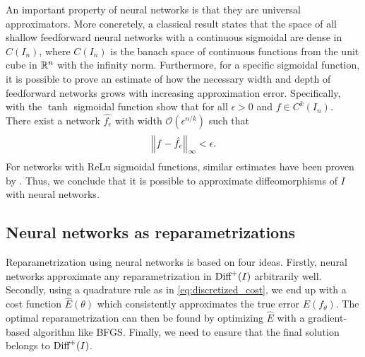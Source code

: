 An important property of neural networks is that they are universal approximators. More concretely, a classical result \cite[Theorem 2]{cybenko1989} states that the space of all shallow feedforward neural networks with a continuous sigmoidal are dense in \(C(I_n)\), where \(C(I_n)\) is the banach space of continuous functions from the unit cube in \(\mathbb{R}^n\) with the infinity norm.  Furthermore, for a specific sigmoidal function, it is possible to prove an estimate of how the necessary width and depth of feedforward networks grows with increasing approximation error. Specifically, with the \(\tanh\) sigmoidal function \citeauthor{ryck2021} \cite[Theorem 5.1]{ryck2021} show that for all \(\epsilon > 0 \) and \(f \in C^k(I_n)\). There exist a network \(\hat{f_\epsilon}\) with width \(\mathcal{O}(\epsilon^{n / k})\) such that
\begin{equation*}
  \norm{f - \hat{f_\epsilon}}_\infty < \epsilon.
\end{equation*}
For networks with ReLu sigmoidal functions, similar estimates have been proven by \citeauthor{yarotsky2017} \cite{yarotsky2017}. Thus, we conclude that it is possible to approximate diffeomorphisms of \(I\)  with neural networks.


\subsection{Neural networks as reparametrizations}\label{subsec:neural-nets}
Reparametrization using neural networks is based on four ideas. Firstly, neural networks approximate any reparametrization in \(\text{Diff}^+(I)\) arbitrarily well. Secondly, using a quadrature rule as in \eqref{eq:discretized_cost}, we end up with a cost function \(\hat E(\theta)\) which consistently approximates the true error \(E(f_\theta)\). The optimal reparametrization can then be found by optimizing \(\hat E\) with a gradient-based algorithm like BFGS\@. Finally, we need to ensure that the final solution belongs to \(\text{Diff}^+(I)\).

